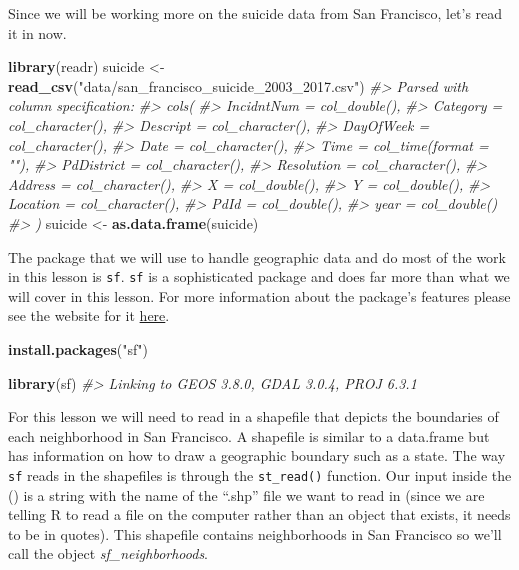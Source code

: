 \documentclass[
  12pt,
]{book}
\newenvironment{Shaded}{\begin{snugshade}}{\end{snugshade}}
\newcommand{\CommentTok}[1]{\textcolor[rgb]{0.37,0.37,0.37}{\textit{#1}}}
\newcommand{\KeywordTok}[1]{\textcolor[rgb]{0.27,0.27,0.27}{\textbf{#1}}}
\newcommand{\NormalTok}[1]{#1}
\newcommand{\StringTok}[1]{\textcolor[rgb]{0.5,0.5,0.5}{#1}}
\begin{document}
Since we will be working more on the suicide data from San Francisco, let's read it in now.

\begin{Shaded}
\begin{Highlighting}[]
\KeywordTok{library}\NormalTok{(readr)}
\NormalTok{suicide <{-}}\StringTok{ }\KeywordTok{read\_csv}\NormalTok{(}\StringTok{"data/san\_francisco\_suicide\_2003\_2017.csv"}\NormalTok{)}
\CommentTok{\#> Parsed with column specification:}
\CommentTok{\#> cols(}
\CommentTok{\#>   IncidntNum = col\_double(),}
\CommentTok{\#>   Category = col\_character(),}
\CommentTok{\#>   Descript = col\_character(),}
\CommentTok{\#>   DayOfWeek = col\_character(),}
\CommentTok{\#>   Date = col\_character(),}
\CommentTok{\#>   Time = col\_time(format = ""),}
\CommentTok{\#>   PdDistrict = col\_character(),}
\CommentTok{\#>   Resolution = col\_character(),}
\CommentTok{\#>   Address = col\_character(),}
\CommentTok{\#>   X = col\_double(),}
\CommentTok{\#>   Y = col\_double(),}
\CommentTok{\#>   Location = col\_character(),}
\CommentTok{\#>   PdId = col\_double(),}
\CommentTok{\#>   year = col\_double()}
\CommentTok{\#> )}
\NormalTok{suicide <{-}}\StringTok{ }\KeywordTok{as.data.frame}\NormalTok{(suicide)}
\end{Highlighting}
\end{Shaded}

The package that we will use to handle geographic data and do most of the work in this lesson is \texttt{sf}. \texttt{sf} is a sophisticated package and does far more than what we will cover in this lesson. For more information about the package's features please see the website for it \href{http://r-spatial.github.io/sf/}{here}.

\begin{Shaded}
\begin{Highlighting}[]
\KeywordTok{install.packages}\NormalTok{(}\StringTok{"sf"}\NormalTok{)}
\end{Highlighting}
\end{Shaded}

\begin{Shaded}
\begin{Highlighting}[]
\KeywordTok{library}\NormalTok{(sf)}
\CommentTok{\#> Linking to GEOS 3.8.0, GDAL 3.0.4, PROJ 6.3.1}
\end{Highlighting}
\end{Shaded}

For this lesson we will need to read in a shapefile that depicts the boundaries of each neighborhood in San Francisco. A shapefile is similar to a data.frame but has information on how to draw a geographic boundary such as a state. The way \texttt{sf} reads in the shapefiles is through the \texttt{st\_read()} function. Our input inside the () is a string with the name of the ``.shp'' file we want to read in (since we are telling R to read a file on the computer rather than an object that exists, it needs to be in quotes). This shapefile contains neighborhoods in San Francisco so we'll call the object \emph{sf\_neighborhoods}.
\end{document}
